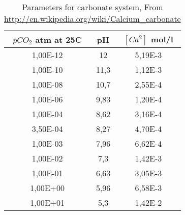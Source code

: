 \documentclass[11pt,a4paper,twoside]{report}
\begin{document}
\begin{table}[ht]
\setlength{\tabcolsep}{20pt}
\begin{center}
\begin{tabular}{| c| c | c |}
\hline
$pCO_{2}$ atm at 25C & pH & $[Ca^{2}]$ mol/l \\
\hline
1,00E-12 & 12   & 5,19E-3 \\
\hline
1,00E-10 & 11,3 & 1,12E-3 \\
\hline
1,00E-08 & 10,7 & 2,55E-4 \\
\hline
1,00E-06 & 9,83 & 1,20E-4 \\
\hline
1,00E-04 & 8,62 & 3,16E-4 \\
\hline
3,50E-04 & 8,27 & 4,70E-4 \\
\hline
1,00E-03 & 7,96 & 6,62E-4 \\
\hline
1,00E-02 & 7,3  & 1,42E-3 \\
\hline
1,00E-01 & 6,63 & 3,05E-3 \\
\hline
1,00E+00 & 5,96 & 6,58E-3 \\
\hline
1,00E+01 & 5,3  & 1,42E-2 \\
\hline
\end{tabular}
\caption{Parameters for carbonate system, From \url{http://en.wikipedia.org/wiki/Calcium_carbonate}}
\label{carbonateca}
\end{center}
\end{table}
\end{document}
